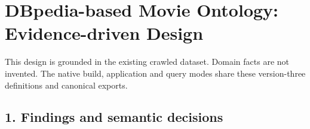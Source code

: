 \documentclass[
  11pt,
]{article}
\author{}
\date{}
\begin{document}
\section{\texorpdfstring{D\allowbreak{}Bpedia-\allowbreak{}based Movie
Ontology: Evidence\allowbreak{}-\allowbreak{}driven
Design}{ Movie Ontology:  Design}}\label{dbpedia-based-movie-ontology-evidence-driven-design}

This design is grounded in the existing crawled dataset. Domain facts
are not invented. The native build, application and query modes share
these version-\allowbreak{}three definitions and canonical exports.

\subsection{1. Findings and semantic
decisions}\label{findings-and-semantic-decisions}
\end{document}
